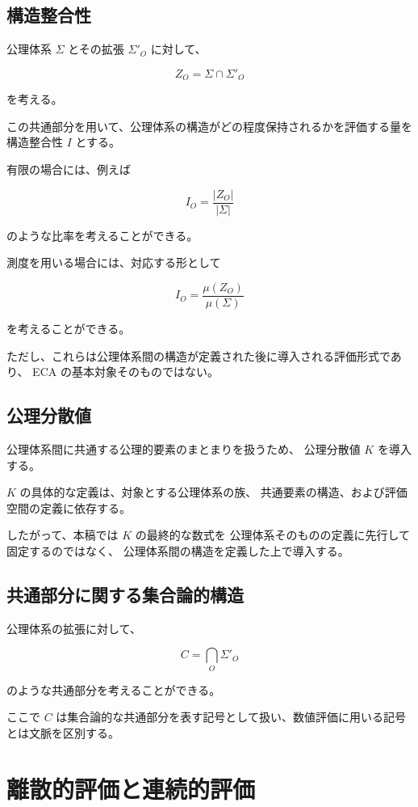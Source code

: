 \documentclass[12pt,a4paper]{article}
\begin{document}
\subsection{構造整合性}

公理体系 $\Sigma$ とその拡張 $\Sigma'_O$ に対して、

\[
Z_O=\Sigma\cap\Sigma'_O
\]

を考える。

この共通部分を用いて、公理体系の構造がどの程度保持されるかを評価する量を構造整合性 $I$ とする。

有限の場合には、例えば

\[
I_O=
\frac{|Z_O|}{|\Sigma|}
\]

のような比率を考えることができる。

測度を用いる場合には、対応する形として

\[
I_O=
\frac{\mu(Z_O)}{\mu(\Sigma)}
\]

を考えることができる。

ただし、これらは公理体系間の構造が定義された後に導入される評価形式であり、
ECA の基本対象そのものではない。

\subsection{公理分散値}

公理体系間に共通する公理的要素のまとまりを扱うため、
公理分散値 $K$ を導入する。

$K$ の具体的な定義は、対象とする公理体系の族、
共通要素の構造、および評価空間の定義に依存する。

したがって、本稿では $K$ の最終的な数式を
公理体系そのものの定義に先行して固定するのではなく、
公理体系間の構造を定義した上で導入する。

\subsection{共通部分に関する集合論的構造}

公理体系の拡張に対して、

\[
C=\bigcap_{O}\Sigma'_O
\]

のような共通部分を考えることができる。

ここで $C$ は集合論的な共通部分を表す記号として扱い、数値評価に用いる記号とは文脈を区別する。

\section{離散的評価と連続的評価}
\end{document}
